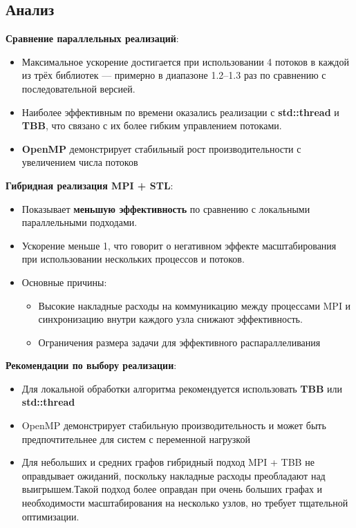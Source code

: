 \documentclass[12pt]{article}
\begin{document}
\subsection*{Анализ}
\hspace*{1.25em}\textbf{Сравнение параллельных реализаций}:
\begin{itemize}
\item Максимальное ускорение достигается при использовании 4 потоков в каждой из трёх библиотек — примерно в диапазоне 1.2–1.3 раз по сравнению с последовательной версией.
\item Наиболее эффективным по времени оказались реализации с \textbf{std::thread} и \textbf{TBB}, что связано с их более гибким управлением потоками.
\item \textbf{OpenMP} демонстрирует стабильный рост производительности с увеличением числа потоков
\end{itemize}

\textbf{Гибридная реализация MPI + STL}:
\begin{itemize}
\item Показывает \textbf{меньшую эффективность} по сравнению с локальными параллельными подходами.
\item Ускорение меньше 1, что говорит о негативном эффекте масштабирования при использовании нескольких процессов и потоков.
\item Основные причины:
\begin{itemize}
\item Высокие накладные расходы на коммуникацию между процессами MPI и синхронизацию внутри каждого узла снижают эффективность.
\item Ограничения размера задачи для эффективного распараллеливания
\end{itemize}
\end{itemize}

\textbf{Рекомендации по выбору реализации}:
\begin{itemize}
\item Для локальной обработки алгоритма рекомендуется использовать \textbf{TBB} или \textbf{std::thread}
\item OpenMP демонстрирует стабильную производительность и может быть предпочтительнее для систем с переменной нагрузкой
\item Для небольших и средних графов гибридный подход MPI + TBB не оправдывает ожиданий, поскольку накладные расходы преобладают над выигрышем.Такой подход более оправдан при очень больших графах и необходимости масштабирования на несколько узлов, но требует тщательной оптимизации.
\end{itemize}
\end{document}
